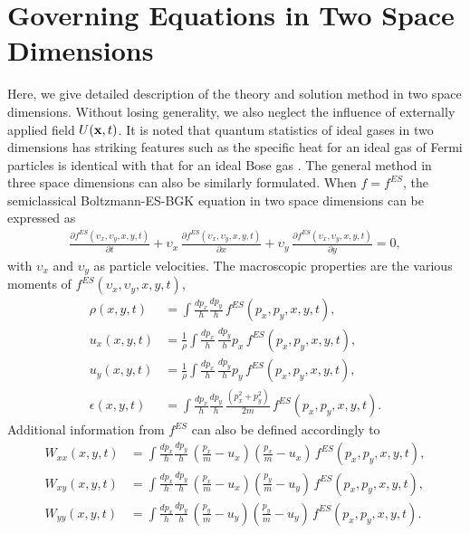 \documentclass{rsproca}%
\begin{document}
\section{Governing Equations in Two Space Dimensions}
\label{sec:3}
Here, we give detailed description of the theory and solution method in two space dimensions.  Without losing generality, we also neglect the influence of externally applied field \(U({\bf x},t)\).  It is noted that quantum statistics of ideal gases in two dimensions has striking features such as the specific heat for an ideal gas of Fermi particles is identical with that for an ideal Bose gas \cite{May1964}. The general method in three space dimensions can also be similarly formulated.   When $f=f^{ES}$, the semiclassical Boltzmann-ES-BGK equation in two space dimensions can be expressed as
\begin{align}
\frac{\partial f^{ES}({\upsilon}_x,{\upsilon}_y, x, y, t)}{\partial t} + {\upsilon}_x\,\frac{\partial f^{ES}({\upsilon}_x,{\upsilon}_y, x, y, t)}{\partial x } + {\upsilon}_y\,\frac{\partial f^{ES}({\upsilon}_x,{\upsilon}_y, x, y, t)} {\partial y} =0, 
\label{eq:normalized_B_ES_BGK}
\end{align}
with ${\upsilon}_x$ and ${\upsilon}_y$ as particle velocities.   The macroscopic properties are the various moments of $f^{ES}({\upsilon}_x,{\upsilon}_y,x,y,t)$,
\begin{subequations}
\begin{align}
\rho (x,y,t) 			&= \int \frac{ d p_x}{h} \frac{ d p_y}{h} \, f^{ES}(p_x, p_y, x, y, t), \\
u_x (x,y,t) 			&= \frac{1}{\rho} \int 	 \frac{ d p_x}{h} \, \frac{ d p_y}{h}  p_x \, f^{ES}(p_x, p_y, x, y, t), \\
u_y (x,y,t) 			&= \frac{1}{\rho} \int 	 \frac{ d p_x}{h} \, \frac{ d p_y}{h}  p_y \, f^{ES}(p_x, p_y, x, y, t), \\
\epsilon (x,y,t) 	&= \int \frac{ d p_x}{h} \frac{ d p_y}{h} \, \frac{(p_x^2 + p_y^2)}{2m} \, f^{ES}(p_x, p_y, x, y, t).
\end{align}
\end{subequations}
Additional information from $f^{ES}$ can also be defined accordingly to
\begin{subequations}
\begin{align}
W_{x x}(x,y,t)	&=	\int \frac{ d p_x}{h} \frac{ d p_y}{h} \, (\frac{p_x}{m}-u_x)(\frac{p_x}{m}-u_x)\,f^{ES}(p_x, p_y, x, y, t), \\
W_{x y}(x,y,t)	&=	\int \frac{ d p_x}{h} \frac{ d p_y}{h} \, (\frac{p_x}{m}-u_x)(\frac{p_y}{m}-u_y)\,f^{ES}(p_x, p_y, x, y, t), \\
W_{y y}(x,y,t)	&=	\int \frac{ d p_x}{h} \frac{ d p_y}{h} \, (\frac{p_y}{m}-u_y)(\frac{p_y}{m}-u_y)\,f^{ES}(p_x, p_y, x, y, t).
\end{align}
\end{subequations}
\end{document}
